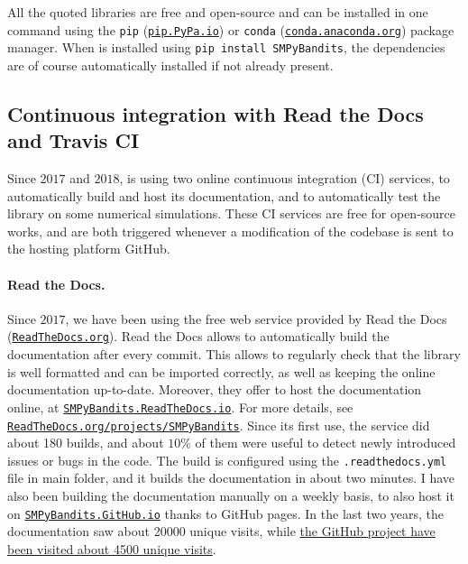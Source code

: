 All the quoted libraries are free and open-source and can be installed in one command using the \texttt{pip} (\texttt{\href{https://pip.pypa.io/}{pip.PyPa.io}}) or \texttt{conda} (\texttt{\href{http://conda.anaconda.org/}{conda.anaconda.org}}) package manager.
%
When \SMPyBandits{} is installed using \texttt{pip install SMPyBandits}, the dependencies are of course automatically installed if not already present.


\subsection{Continuous integration with Read the Docs and Travis CI}

Since $2017$ and $2018$, \SMPyBandits{} is using two online continuous integration (CI) services, to automatically build and host its documentation, and to automatically test the library on some numerical simulations.
%
These CI services are free for open-source works, and are both triggered whenever a modification of the codebase is sent to the hosting platform GitHub.

\paragraph{Read the Docs.}
Since $2017$, we have been using the free web service provided by Read the Docs (\href{https://readthedocs.org/}{\texttt{ReadTheDocs.org}}).
Read the Docs allows to automatically build the documentation after every commit. This allows to regularly check that the library is well formatted and can be imported correctly, as well as keeping the online documentation up-to-date.
Moreover, they offer to host the documentation online, at \href{https://smpybandits.rtfd.io/}{\texttt{SMPyBandits.ReadTheDocs.io}}.
For more details, see \href{https://readthedocs.org/projects/smpybandits/}{\texttt{ReadTheDocs.org/projects/SMPyBandits}}.
%
Since its first use, the service did about 180 builds, and about $10\%$ of them were useful to detect newly introduced issues or bugs in the code.
The build is configured using the \texttt{.readthedocs.yml} file in \SMPyBandits{} main folder, and it builds the documentation in about two minutes.
I have also been building the documentation manually on a weekly basis, to also host it on \href{https://smpybandits.github.io/}{\texttt{SMPyBandits.GitHub.io}} thanks to GitHub pages.
In the last two years, the documentation saw about 20000 unique visits, while \href{https://github.com/SMPyBandits/SMPyBandits/graphs/traffic}{the GitHub project have been visited about 4500 unique visits}.


